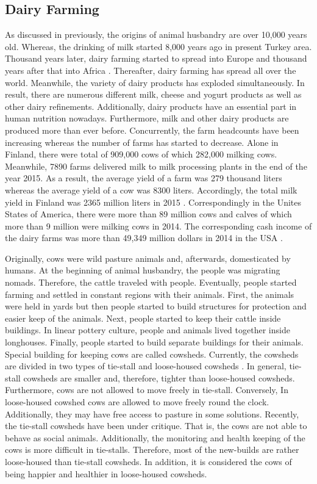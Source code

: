 \documentclass[english,12pt,a4paper,pdftex,elec,utf8]{aaltothesis}
\begin{document}
\subsection{Dairy Farming} \label{dairyfarmingsection}

As discussed in previously, the origins of animal husbandry are over 10,000 years old. Whereas, the drinking of milk started 8,000 years ago in present Turkey area. Thousand years later, dairy farming started to spread into Europe and thousand years after that into Africa \cite{ancienthistoryofmilk}. Thereafter, dairy farming has spread all over the world. Meanwhile, the variety of dairy products has exploded simultaneously. In result, there are numerous different milk, cheese and yogurt products as well as other dairy refinements. Additionally, dairy products have an essential part in human nutrition nowadays. Furthermore, milk and other dairy products are produced more than ever before. Concurrently, the farm headcounts have been increasing whereas the number of farms has started to decrease. Alone in Finland, there were total of 909,000 cows of which 282,000 milking cows. Meanwhile, 7890 farms delivered milk to milk processing plants in the end of the year 2015. As a result, the average yield of a farm was 279 thousand liters whereas the average yield of a cow was 8300 liters. Accordingly, the total milk yield in Finland was 2365 million liters in 2015 \cite{ruokajaluonnonvaratilastot2016}. Correspondingly in the Unites States of America, there were more than 89 million cows and calves of which more than 9 million were milking cows in 2014. The corresponding cash income of the dairy farms was more than 49,349 million dollars in 2014 in the USA \cite{agriculturalstatistics2015}.


Originally, cows were wild pasture animals and, afterwards,  domesticated by humans. At the beginning of animal husbandry, the people was migrating nomads. Therefore, the cattle traveled with people. Eventually, people started farming and settled in constant regions with their animals. First, the animals were held in yards but then people started to build structures for protection and easier keep of the animals. Next, people started to keep their cattle inside buildings. In linear pottery culture, people and animals lived together inside longhouses. Finally, people started to build separate buildings for their animals. Special building for keeping cows are called cowsheds. Currently, the cowsheds are divided in two types of tie-stall and loose-housed cowsheds \cite{lehmahavaintoja}. In general, tie-stall cowsheds are smaller and, therefore,  tighter than loose-housed cowsheds. Furthermore, cows are not allowed to move freely in tie-stall. Conversely, In loose-housed cowshed cows are allowed to move freely round the clock. Additionally, they may have free access to pasture in some solutions. Recently, the tie-stall cowsheds have been under critique. That is, the cows are not able to behave as social animals. Additionally, the monitoring and health keeping of the cows is more difficult in tie-stalls. Therefore, most of the new-builds are rather loose-housed than tie-stall cowsheds. In addition, it is considered the cows of being happier and healthier in loose-housed cowsheds. 
\end{document}
